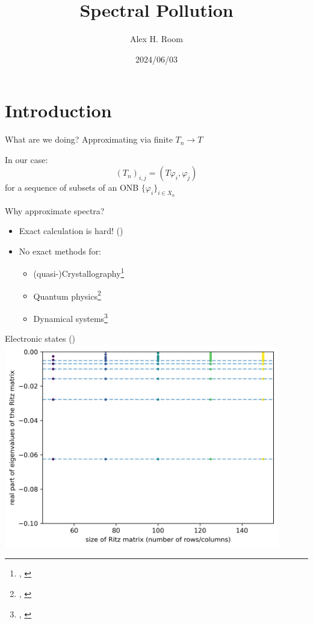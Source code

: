 \documentclass[14pt]{beamer}
\title{Spectral Pollution}
\author{Alex H. Room}
\date{2024/06/03}
\newcommand{\1}{\mathbf{1}}
\begin{document}
\begin{frame}
\titlepage
\end{frame}

\section{Introduction}
\begin{frame}{What are we doing?}
  \centering
  Approximating via finite $T_n \rightarrow T$

  In our case:
  $$(T_n)_{i,j} = (T \varphi_i, \varphi_j)$$
  for a sequence of subsets of an ONB $\{\varphi_i\}_{i \in X_n}$
  \end{frame}

\begin{frame}{Why approximate spectra?}
  \begin{itemize}
    \item Exact calculation is hard! (\textcite{arveson1993role})
    \item No exact methods for:
      \begin{itemize}
        \item (quasi-)Crystallography\footnote{\textcite{colbrook2019how}, \textcite{cances2012periodic}}
        \item Quantum physics\footnote{\textcite{pryce1993numerical}, \textcite{lewin2010spectral}}
        \item Dynamical systems\footnote{\textcite{servadio2022koopman}, \textcite{manning2008descriptor}}
      \end{itemize}
  \end{itemize}
\end{frame}

\begin{frame}{Electronic states (\textcite{pryce1993numerical})}
  \includegraphics[width=0.9\textwidth]{hydrogen}
\end{frame}
\end{document}
